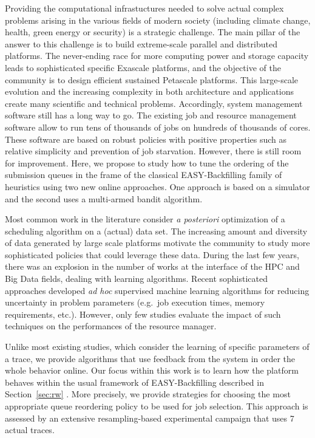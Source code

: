 \documentclass[sigconf,anonymous]{acmart}
\begin{document}
Providing the computational infrastuctures needed to solve actual complex
problems arising in the various fields of modern society (including climate
change, health, green energy or security) is a strategic challenge. The main
pillar of the answer to this challenge is to build extreme-scale parallel and
distributed platforms. The never-ending race for more computing power and
storage capacity leads to sophisticated specific Exascale platforms, and the
objective of the community is to design efficient sustained Petascale
platforms. This large-scale evolution and the increasing complexity in both
architecture and applications create many scientific and technical problems.
Accordingly, system management software still has a long way to go. The
existing job and resource management software allow to run tens of thousands of
jobs on hundreds of thousands of cores. These software are based on robust
policies with positive properties such as relative simplicity and prevention of
job starvation. However, there is still room for improvement. Here, we propose
to study how to tune the ordering of the submission queues in the frame of the
classical EASY-Backfilling family of heuristics using two new online approaches.
One approach is based on a simulator and the second uses a multi-armed bandit
algorithm.

Most common work in the literature consider \textit{a posteriori} optimization
of a scheduling algorithm on a (actual) data set.  The increasing amount and
diversity of data generated by large scale platforms motivate the community to
study more sophisticated policies that could leverage these data.  During the
last few years, there was an explosion in the number of works at the interface
of the HPC and Big Data fields, dealing with learning algorithms. Recent
sophisticated approaches developed \textit{ad hoc} supervised machine learning
algorithms for reducing uncertainty in problem parameters (e.g.\ job execution
times, memory requirements, etc.). However, only few studies
evaluate the impact of such techniques on the performances of the resource
manager.

Unlike most existing studies, which consider the learning of specific
parameters of a trace, we provide algorithms that use feedback from the
system in order the whole behavior online. Our focus within this work is
to learn how the platform behaves within the usual framework of
EASY-Backfilling described in Section~\ref{sec:rw} . More precisely, we provide strategies for choosing the most
appropriate queue reordering policy to be used for job selection. This approach
is assessed by an extensive resampling-based experimental campaign that uses 7
actual traces.
\end{document}

